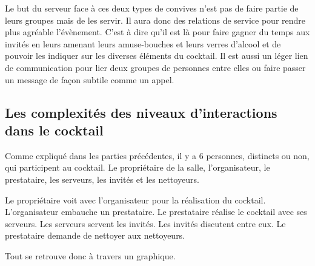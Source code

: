 Le but du serveur face à ces deux types de convives n’est pas de faire partie de leurs groupes mais de les servir. Il aura donc des relations de service pour rendre plus agréable l’évènement. C’est à dire qu’il est là pour faire gagner du temps aux invités en leurs amenant leurs amuse-bouches et leurs verres d’alcool et de pouvoir les indiquer sur les diverses éléments du cocktail. Il est aussi un léger lien de communication pour lier deux groupes de personnes entre elles ou faire passer un message de façon subtile comme un appel. 


\subsection{Les complexités des niveaux d'interactions dans le cocktail}

Comme expliqué dans les parties précédentes, il y a 6 personnes, distincts ou non, qui participent au cocktail. Le propriétaire de la salle, l’organisateur, le prestataire, les serveurs, les invités et les nettoyeurs.

Le propriétaire voit avec l’organisateur pour la réalisation du cocktail. L’organisateur embauche un prestataire. Le prestataire réalise le cocktail avec ses serveurs. Les serveurs servent les invités. Les invités discutent entre eux. Le prestataire demande de nettoyer aux nettoyeurs.

Tout se retrouve donc à travers un graphique.


